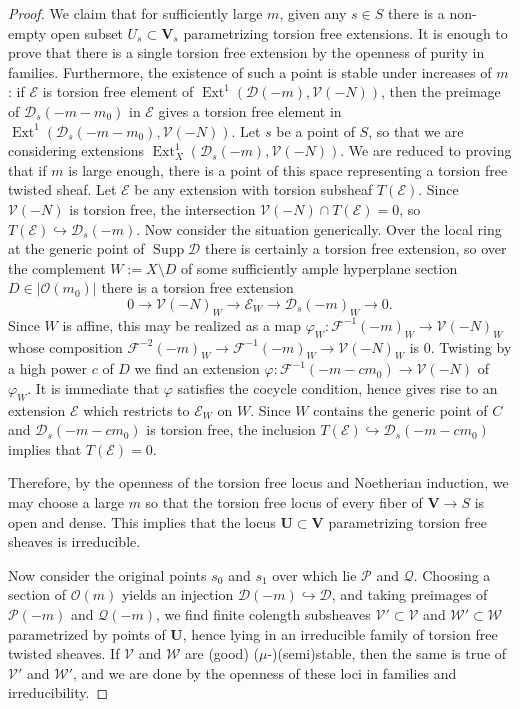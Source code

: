 \documentclass[11pt]{amsart}
\newcommand{\ms}[1]{\mathscr #1}
\renewcommand{\phi}{\varphi}
\DeclareMathOperator{\supp}{Supp}
\DeclareMathOperator{\ext}{\operatorname{Ext}}
\renewcommand{\[}{[\!\hspace{0.03em}[}
\renewcommand{\]}{]\!\hspace{0.03em}]}
\renewcommand{\(}{(\!\hspace{0.03em}(}
\renewcommand{\)}{)\!\hspace{0.03em})}
\newcommand{\inj}{\hookrightarrow}
\theoremstyle{definition}
\theoremstyle{remark}
\begin{document}
\begin{proof}
We claim that for sufficiently large $m$, given any $s\in S$ there is a 
non-empty open subset $U_{s}\subset\mathbf V_{s}$ parametrizing 
torsion free extensions.  It is enough to prove that there is a 
single torsion free extension by the openness of purity in families.  
Furthermore, the existence of such a point is stable under increases 
of $m$: if $\ms E$ is torsion free element of $\ext^{1}(\ms D(-m),\ms 
V(-N))$, then the preimage of $\ms D_{s}(-m-m_{0})$ in $\ms E$ gives a torsion 
free element in $\ext^{1}(\ms D_{s}(-m-m_{0}),\ms V(-N))$.
Let $s$ be a point of $S$, so that we are considering extensions 
$\ext^{1}_{X}(\ms D_{s}(-m),\ms V(-N))$.  We are reduced to proving 
that if $m$ is large enough, there is a point of this space 
representing a torsion free twisted sheaf.  Let $\ms E$ be any 
extension with torsion subsheaf $T(\ms E)$.  Since $\ms V(-N)$ is torsion 
free, the intersection $\ms V(-N)\cap T(\ms E)=0$, so $T(\ms E)\inj\ms 
D_{s}(-m)$.  Now consider the situation generically.  Over the local 
ring at the generic point of $\supp\ms D$ there is certainly a torsion free 
extension, so over the complement $W:=X\setminus D$ of some sufficiently ample hyperplane 
section $D\in|{\ms O}(m_{0})|$ there is a torsion free extension
$$0\to\ms V(-N)_{W}\to\ms E_{W}\to\ms D_{s}(-m)_{W}\to 0.$$
Since $W$ is affine, 
this may be realized as a map $\phi_{W}:\ms F^{-1}(-m)_{W}\to\ms V(-N)_{W}$ 
whose composition $\ms F^{-2}(-m)_{W}\to\ms F^{-1}(-m)_{W}\to\ms 
V(-N)_{W}$ is $0$.  Twisting by a high power $c$ of $D$ we find an 
extension $\phi:\ms F^{-1}(-m-cm_{0})\to\ms V(-N)$ of $\phi_{W}$.  It 
is immediate that $\phi$ satisfies the cocycle condition, hence gives 
rise to an extension $\ms E$ which restricts to $\ms E_{W}$ on $W$.  
Since $W$ contains the generic point of $C$ and $\ms D_{s}(-m-cm_{0})$ 
is torsion free, the inclusion $T(\ms E)\inj\ms D_{s}(-m-cm_{0})$ 
implies that $T(\ms E)=0$.  

Therefore, by the openness of the torsion free locus 
and Noetherian induction, we may choose a large $m$ so that the 
torsion free locus of every fiber of $\mathbf V\to S$ is open and 
dense.  This implies that the locus $\mathbf U\subset\mathbf V$ parametrizing 
torsion free sheaves is irreducible.  

Now consider the original points $s_{0}$ and $s_{1}$ over which lie 
$\ms P$ and $\ms Q$.  Choosing a section of ${\ms O}(m)$ yields an 
injection $\ms D(-m)\inj\ms D$, and taking preimages of $\ms P(-m)$ 
and $\ms Q(-m)$, we find finite 
colength subsheaves $\ms V'\subset\ms V$ and $\ms W'\subset\ms W$ 
parametrized by points of $\mathbf U$, hence lying in an irreducible
family of torsion free twisted sheaves.  If $\ms V$ and $\ms W$ are 
(good) ($\mu$-)(semi)stable, then the same is true of $\ms V'$ and $\ms W'$, 
and we are done by the openness of these loci in families and 
irreducibility.
\end{proof}
\end{document}
